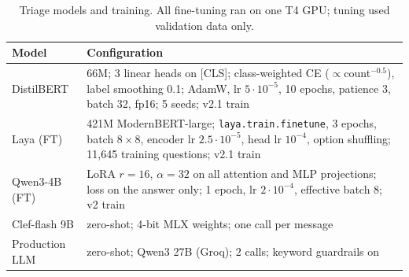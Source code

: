 \documentclass[conference]{IEEEtran}
\begin{document}
\begin{table}[t]
\centering
\caption{Triage models and training. All fine-tuning ran on one T4 GPU; tuning used validation data only.}
\label{tab:models}
\footnotesize
\setlength{\tabcolsep}{2.5pt}
\begin{tabular}{@{}lp{5.6cm}@{}}
\toprule
Model & Configuration \\
\midrule
DistilBERT & 66M; 3 linear heads on [CLS]; class-weighted CE ($\propto$count$^{-0.5}$), label smoothing 0.1; AdamW,
lr $5{\cdot}10^{-5}$, 10 epochs, patience 3, batch 32, fp16; 5 seeds; v2.1 train \\
Laya (FT) & 421M ModernBERT-large; \texttt{laya.train.finetune}, 3 epochs, batch $8{\times}8$, encoder lr
$2.5{\cdot}10^{-5}$, head lr $10^{-4}$, option shuffling; 11,645 training questions; v2.1 train \\
Qwen3-4B (FT) & LoRA $r{=}16$, $\alpha{=}32$ on all attention and MLP projections; loss on the answer only;
1 epoch, lr $2{\cdot}10^{-4}$, effective batch 8; v2 train \\
Clef-flash 9B & zero-shot; 4-bit MLX weights; one call per message \\
Production LLM & zero-shot; Qwen3 27B (Groq); 2 calls; keyword guardrails on \\
\bottomrule
\end{tabular}
\end{table}
\end{document}

